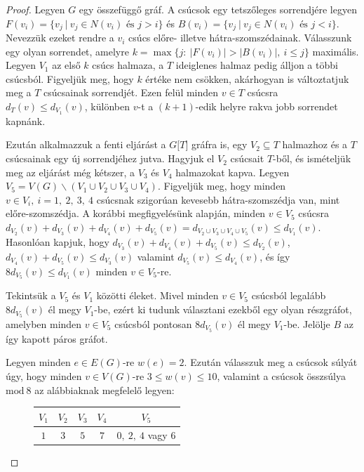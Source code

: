 \documentclass[12pt, a4paper]{report}
\theoremstyle{remark}
\theoremstyle{definition}
\begin{document}
\begin{proof}
Legyen $G$ egy összefüggő gráf. A csúcsok egy tetszőleges sorrendjére legyen $F(v_i) = \lbrace v_j\ |\ v_j \in N(v_i) \textrm{ és } j > i \rbrace$ és $B(v_i) = \lbrace v_j\ |\ v_j \in N(v_i) \textrm{ és } j < i \rbrace$. Nevezzük ezeket rendre a $v_i$ csúcs előre- illetve hátra-szomszédainak. Válasszunk egy olyan sorrendet, amelyre $k = \max \lbrace j:\ |F(v_i)| > |B(v_i)|,\ i \leq j \rbrace$ maximális. Legyen $V_1$ az első $k$ csúcs halmaza, a $T$ ideiglenes halmaz pedig álljon a többi csúcsból. Figyeljük meg, hogy $k$ értéke nem csökken, akárhogyan is változtatjuk meg a $T$ csúcsainak sorrendjét. Ezen felül minden $v \in T$ csúcsra $d_T(v) \leq d_{V_1}(v)$, különben $v$-t a $(k + 1)$-edik helyre rakva jobb sorrendet kapnánk.

Ezután alkalmazzuk a fenti eljárást a $G \lbrack T \rbrack$ gráfra is, egy $V_2 \subseteq T$ halmazhoz és a $T$ csúcsainak egy új sorrendjéhez jutva. Hagyjuk el $V_2$ csúcsait $T$-ből, és ismételjük meg az eljárást még kétszer, a $V_3$ és $V_4$ halmazokat kapva. Legyen $V_5 = V(G) \smallsetminus (V_1 \cup V_2 \cup V_3 \cup V_4)$. Figyeljük meg, hogy minden $v \in V_i,\ i = 1,\ 2,\ 3,\ 4$ csúcsnak szigorúan kevesebb hátra-szomszédja van, mint előre-szomszédja. A korábbi megfigyelésünk alapján, minden $v \in V_5$ csúcsra $d_{V_2}(v) + d_{V_3}(v) + d_{V_4}(v) + d_{V_5}(v) = d_{V_2 \cup V_3 \cup V_4 \cup V_5}(v) \leq d_{V_1}(v)$. Hasonlóan kapjuk, hogy $d_{V_3}(v) + d_{V_4}(v) + d_{V_5}(v) \leq d_{V_2}(v)$, $d_{V_4}(v) + d_{V_5}(v) \leq d_{V_3}(v)$ valamint $d_{V_5}(v) \leq d_{V_4}(v)$, és így $8 d_{V_5}(v) \leq d_{V_1}(v)$ minden $v \in V_5$-re.

Tekintsük a $V_5$ és $V_1$ közötti éleket. Mivel minden $v \in V_5$ csúcsból legalább $8d_{V_5}(v)$ él megy $V_1$-be, ezért ki tudunk választani ezekből egy olyan részgráfot, amelyben minden $v \in V_5$ csúcsból pontosan $8d_{V_5}(v)$ él megy $V_1$-be. Jelölje $B$ az így kapott páros gráfot.

Legyen minden $e \in E(G)$-re $w(e) = 2$. Ezután válasszuk meg a csúcsok súlyát úgy, hogy minden $v \in V(G)$-re $3 \leq w(v) \leq 10$, valamint a csúcsok összsúlya $\mathrm{mod}\ 8$ az alábbiaknak megfelelő legyen:
\begin{figure}[h!]
\centering
\begin{tabular}{|c|c|c|c|c|}
\hline $V_1$ & $V_2$ & $V_3$ & $V_4$ & $V_5$ \\ 
\hline $1$ & $3$ & $5$ & $7$ & $0,\ 2,\ 4$ vagy $6$ \\ 
\hline 
\end{tabular} 
\end{figure}


\end{proof}
\end{document}
